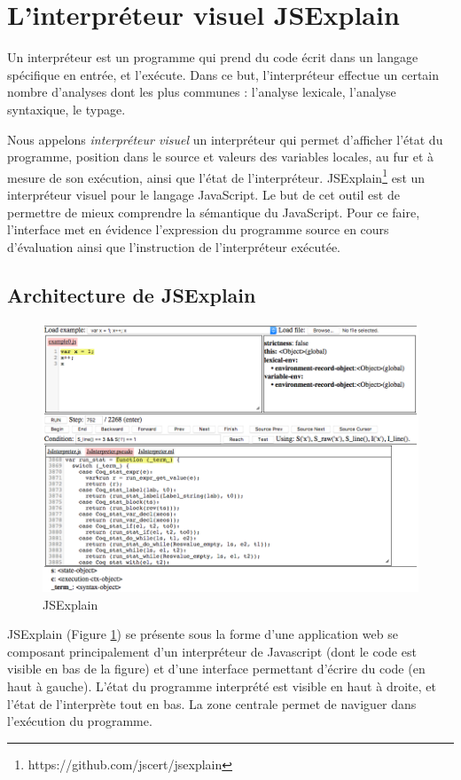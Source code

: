 \documentclass{easychair}
\begin{document}
\section{L'interpréteur visuel JSExplain}

Un interpréteur est un programme qui prend du code écrit dans un langage 
spécifique en entrée, et l'exécute. Dans ce but, l'interpréteur effectue un 
certain nombre d'analyses dont les plus communes : l'analyse lexicale, 
l'analyse syntaxique, le typage.

Nous appelons \emph{interpréteur visuel} un interpréteur qui permet d'afficher
l'état du programme, position dans le source et valeurs des variables locales,
au fur et à mesure de son exécution, ainsi que l'état de l'interpréteur.
JSExplain\footnote{https://github.com/jscert/jsexplain} est un interpréteur
visuel pour le langage JavaScript. Le but de cet outil est de permettre de mieux
comprendre la sémantique du JavaScript. Pour ce faire, l'interface met en
évidence l'expression du programme source en cours d'évaluation ainsi que
l'instruction de l'interpréteur exécutée.

\subsection{Architecture de JSExplain}

\begin{figure}
  \centering
  \includegraphics[width=\textwidth]{jsexplain.png}
  \caption{JSExplain}
  \label{fig:jsexplain}
\end{figure}

JSExplain (Figure \ref{fig:jsexplain}) se présente sous la forme d'une
application web se composant principalement d'un interpréteur de Javascript
(dont le code est visible en bas de la figure) et d'une interface permettant
d'écrire du code (en haut à gauche). L'état du programme interprété est visible
en haut à droite, et l'état de l'interprète tout en bas. La zone centrale permet
de naviguer dans l'exécution du programme.
\end{document}

